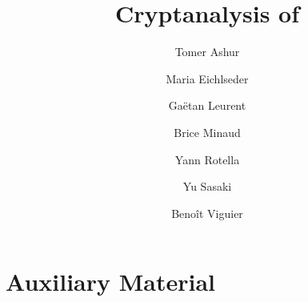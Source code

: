 \documentclass[a4paper]{llncs}
\author{}
\institute{}
\author{Tomer Ashur \and Maria Eichlseder \and Ga\"etan Leurent \and Brice Minaud \and Yann Rotella \and Yu Sasaki \and Beno\^it Viguier}
\institute{}
\begin{document}
\title{Cryptanalysis of \MORUS}
\maketitle
\thispagestyle{plain}











\ifanonymous
\else
\fi




\section*{Auxiliary Material}

\appendix


\end{document}
